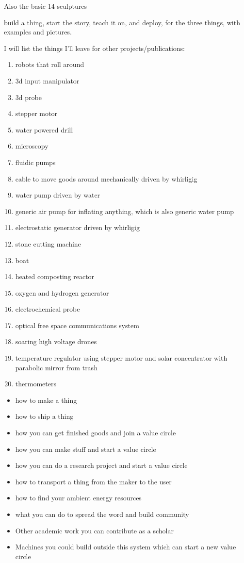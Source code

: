 Also the basic 14 sculptures

build a thing, start the story, teach it on, and deploy, for the three
things, with examples and pictures.

I will list the things I'll leave for other projects/publications:

\begin{enumerate}
\def\labelenumi{\arabic{enumi}.}
\tightlist
\item
  robots that roll around
\item
  3d input manipulator
\item
  3d probe
\item
  stepper motor
\item
  water powered drill
\item
  microscopy
\item
  fluidic pumps
\item
  cable to move goods around mechanically driven by whirligig
\item
  water pump driven by water
\item
  generic air pump for inflating anything, which is also generic water
  pump
\item
  electrostatic generator driven by whirligig
\item
  stone cutting machine
\item
  boat
\item
  heated composting reactor
\item
  oxygen and hydrogen generator
\item
  electrochemical probe
\item
  optical free space communications system
\item
  soaring high voltage drones
\item
  temperature regulator using stepper motor and solar concentrator with
  parabolic mirror from trash
\item
  thermometers
\end{enumerate}

\begin{itemize}
\tightlist
\item
  how to make a thing
\item
  how to ship a thing
\item
  how you can get finished goods and join a value circle
\item
  how you can make stuff and start a value circle
\item
  how you can do a research project and start a value circle
\item
  how to transport a thing from the maker to the user
\item
  how to find your ambient energy resources
\item
  what you can do to spread the word and build community
\item
  Other academic work you can contribute as a scholar
\item
  Machines you could build outside this system which can start a new
  value circle
\end{itemize}

